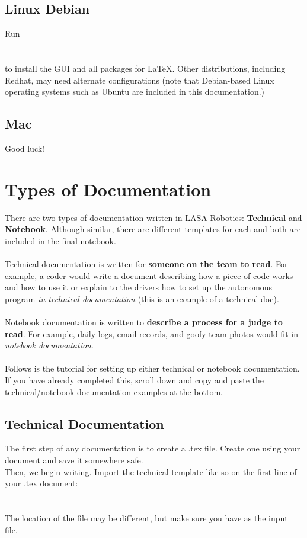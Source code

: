 \subsection{Linux Debian}
Run \\\\\\ to install the GUI and all packages for \LaTeX{}.  Other distributions, including Redhat, may need alternate configurations (note that Debian-based Linux operating systems such as Ubuntu are included in this documentation.)

\subsection{Mac}
Good luck!

\newpage

\section{Types of Documentation}
There are two types of documentation written in LASA Robotics: \textbf{Technical} and \textbf{Notebook}. Although similar, there are different templates for each and both are included in the final notebook.\\\\
Technical documentation is written for \textbf{someone on the team to read}. For example, a coder would write a document describing how a piece of code works and how to use it or explain to the drivers how to set up the autonomous program \emph{in technical documentation} (this is an example of a technical doc).\\\\
Notebook documentation is written to \textbf{describe a process for a judge to read}.  For example, daily logs, email records, and goofy team photos would fit in \emph{notebook documentation}.\\\\
Follows is the tutorial for setting up either technical or notebook documentation.  If you have already completed this, scroll down and copy and paste the technical/notebook documentation examples at the bottom.

\subsection{Technical Documentation}
The first step of any documentation is to create a .tex file.  Create one using your document and save it somewhere safe.\\
Then, we begin writing.  Import the technical template like so on the first line of your .tex document: \\\\\\ The location of the file may be different, but make sure you have  as the input file.

